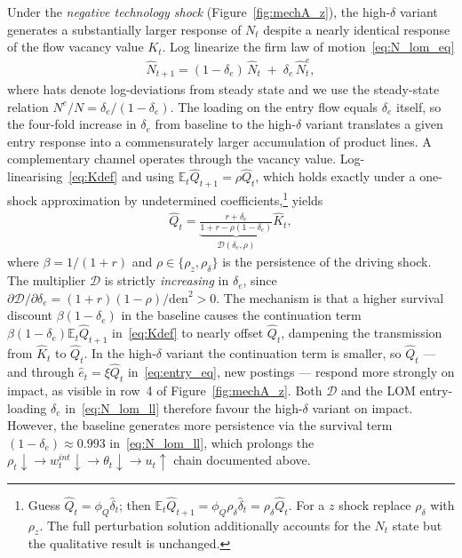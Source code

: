 \documentclass[authoryear, review, 12pt]{elsarticle}
\begin{document}
	Under the \emph{negative technology shock} (Figure~\ref{fig:mechA_z}),
	the high-$\delta$ variant generates a substantially larger
	response of $N_t$ despite a nearly identical response of the flow vacancy value $K_t$. Log linearize the firm law of
	motion~\eqref{eq:N_lom_eq}
	\begin{align}\label{eq:N_lom_ll}
		\hat{N}_{t+1}
		= (1-\delta_e)\,\hat{N}_t \;+\; \delta_e\,\hat{N}_t^e,
	\end{align}
	where hats denote log-deviations from steady state and we use
	the steady-state relation $N^e/N=\delta_e/(1-\delta_e)$.
	The loading on the entry flow equals $\delta_e$ itself, so the
	four-fold increase in $\delta_e$ from baseline to the
	high-$\delta$ variant translates a given entry response into a
	commensurately larger accumulation of product lines.
	A complementary channel operates through the vacancy
	value. Log-linearising~\eqref{eq:Kdef} and using $\mathbb{E}_t\hat{Q}_{t+1}=\rho\hat{Q}_t$,
	which holds exactly under a one-shock approximation by undetermined
	coefficients,\footnote{Guess $\hat{Q}_t=\phi_Q\hat{\delta}_t$; then
	$\mathbb{E}_t\hat{Q}_{t+1}=\phi_Q\rho_\delta\hat{\delta}_t=\rho_\delta\hat{Q}_t$.
	For a $z$ shock replace $\rho_\delta$ with $\rho_z$.  The full
	perturbation solution additionally accounts for the $N_t$ state but
	the qualitative result is unchanged.}
	yields
	\begin{align}\label{eq:Q_ll}
		\hat{Q}_t
		= \underbrace{\frac{r+\delta_e}{1+r-\rho(1-\delta_e)}}_{\displaystyle\mathcal{D}(\delta_e,\rho)}
		\hat{K}_t,
	\end{align}
	where $\beta=1/(1+r)$ and $\rho\in\{\rho_z,\rho_\delta\}$ is the
	persistence of the driving shock.  The multiplier $\mathcal{D}$
	is strictly \emph{increasing} in $\delta_e$, since
	$\partial\mathcal{D}/\partial\delta_e=(1+r)(1-\rho)/\mathrm{den}^2>0$.
	The mechanism is that a higher survival discount $\beta(1-\delta_e)$
	in the baseline causes the continuation term
	$\beta(1-\delta_e)\mathbb{E}_t\hat{Q}_{t+1}$ in~\eqref{eq:Kdef}
	to nearly offset $\hat{Q}_t$, dampening the transmission from
	$\hat{K}_t$ to $\hat{Q}_t$.  In the high-$\delta$ variant the
	continuation term is smaller, so $\hat{Q}_t$ — and through
	$\hat{e}_t=\xi\hat{Q}_t$ in~\eqref{eq:entry_eq}, new
	postings — respond more strongly on impact, as visible in
	row~4 of Figure~\ref{fig:mechA_z}.
	Both $\mathcal{D}$ and the LOM entry-loading $\delta_e$
	in~\eqref{eq:N_lom_ll} therefore favour the high-$\delta$
	variant on impact.  However, the baseline generates more persistence via the survival term $(1-\delta_e)\approx0.993$
	in~\eqref{eq:N_lom_ll}, which prolongs the
	$\rho_t\downarrow\to w_t^{int}\downarrow\to\theta_t\downarrow\to u_t\uparrow$
	chain documented above.
	
\end{document}
